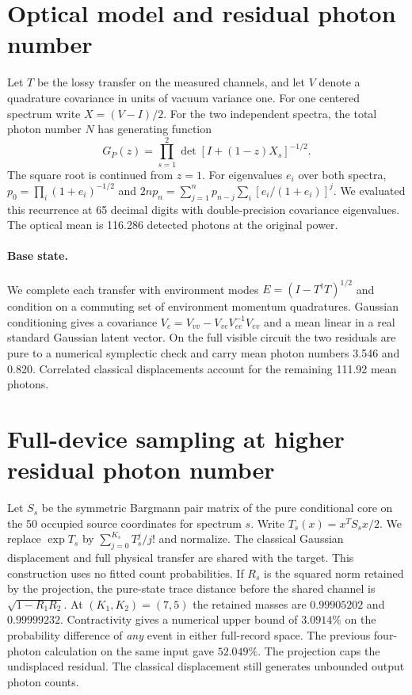 \documentclass[11pt]{article}
\begin{document}
\section{Optical model and residual photon number}\label{sec:optical}
Let $T$ be the lossy transfer on the measured channels, and let $V$ denote a quadrature covariance in units of vacuum variance one. For one centered spectrum write $X=(V-I)/2$. For the two independent spectra, the total photon number $N$ has generating function
\begin{equation}
 G_P(z)=\prod_{s=1}^{2}\det[I+(1-z)X_s]^{-1/2}.
 \label{eq:pgf}
\end{equation}
The square root is continued from $z=1$. For eigenvalues $e_i$ over both spectra, $p_0=\prod_i(1+e_i)^{-1/2}$ and
$2n p_n=\sum_{j=1}^{n}p_{n-j}\sum_i[e_i/(1+e_i)]^j$.
We evaluated this recurrence at 65 decimal digits with double-precision covariance eigenvalues. The optical mean is 116.286 detected photons at the original power.

\paragraph{Base state.}
We complete each transfer with environment modes $E=(I-T^\dagger T)^{1/2}$ and condition on a commuting set of environment momentum quadratures. Gaussian conditioning gives a covariance $V_c=V_{vv}-V_{ve}V_{ee}^{-1}V_{ev}$ and a mean linear in a real standard Gaussian latent vector. On the full visible circuit the two residuals are pure to a numerical symplectic check and carry mean photon numbers 3.546 and 0.820. Correlated classical displacements account for the remaining 111.92 mean photons.

\section{Full-device sampling at higher residual photon number}\label{sec:auxiliary}
Let $S_s$ be the symmetric Bargmann pair matrix of the pure conditional core on the 50 occupied source coordinates for spectrum $s$. Write $T_s(x)=x^T S_s x/2$. We replace $\exp T_s$ by $\sum_{j=0}^{K_s}T_s^j/j!$ and normalize. The classical Gaussian displacement and full physical transfer are shared with the target. This construction uses no fitted count probabilities. If $R_s$ is the squared norm retained by the projection, the pure-state trace distance before the shared channel is $\sqrt{1-R_1R_2}$. At $(K_1,K_2)=(7,5)$ the retained masses are $0.99905202$ and $0.99999232$. Contractivity gives a numerical upper bound of $3.0914\%$ on the probability difference of \emph{any} event in either full-record space. The previous four-photon calculation on the same input gave $52.049\%$. The projection caps the undisplaced residual. The classical displacement still generates unbounded output photon counts.
\end{document}
